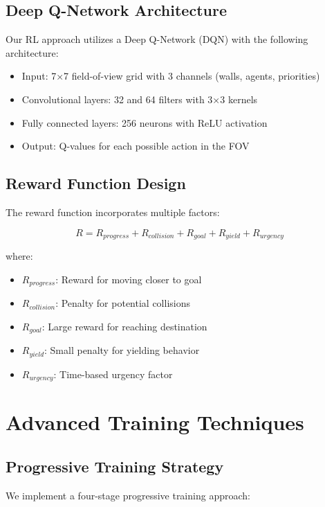 \documentclass[12pt, a4paper]{report}
\begin{document}
\subsection{Deep Q-Network Architecture}
Our RL approach utilizes a Deep Q-Network (DQN) with the following architecture:

\begin{itemize}
    \item Input: 7×7 field-of-view grid with 3 channels (walls, agents, priorities)
    \item Convolutional layers: 32 and 64 filters with 3×3 kernels
    \item Fully connected layers: 256 neurons with ReLU activation
    \item Output: Q-values for each possible action in the FOV
\end{itemize}

\subsection{Reward Function Design}
The reward function incorporates multiple factors:

\begin{equation}
R = R_{progress} + R_{collision} + R_{goal} + R_{yield} + R_{urgency}
\end{equation}

where:
\begin{itemize}
    \item $R_{progress}$: Reward for moving closer to goal
    \item $R_{collision}$: Penalty for potential collisions
    \item $R_{goal}$: Large reward for reaching destination
    \item $R_{yield}$: Small penalty for yielding behavior
    \item $R_{urgency}$: Time-based urgency factor
\end{itemize}

\section{Advanced Training Techniques}

\subsection{Progressive Training Strategy}
We implement a four-stage progressive training approach:
\end{document}
